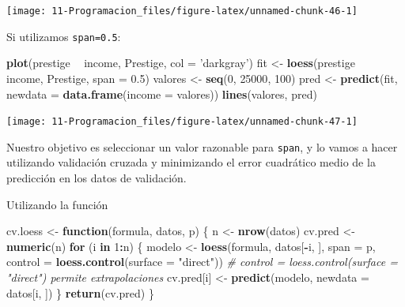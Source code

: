 \documentclass[]{book}
\newenvironment{Shaded}{\begin{snugshade}}{\end{snugshade}}
\newcommand{\KeywordTok}[1]{\textcolor[rgb]{0.13,0.29,0.53}{\textbf{#1}}}
\newcommand{\DataTypeTok}[1]{\textcolor[rgb]{0.13,0.29,0.53}{#1}}
\newcommand{\DecValTok}[1]{\textcolor[rgb]{0.00,0.00,0.81}{#1}}
\newcommand{\FloatTok}[1]{\textcolor[rgb]{0.00,0.00,0.81}{#1}}
\newcommand{\StringTok}[1]{\textcolor[rgb]{0.31,0.60,0.02}{#1}}
\newcommand{\CommentTok}[1]{\textcolor[rgb]{0.56,0.35,0.01}{\textit{#1}}}
\newcommand{\ControlFlowTok}[1]{\textcolor[rgb]{0.13,0.29,0.53}{\textbf{#1}}}
\newcommand{\OperatorTok}[1]{\textcolor[rgb]{0.81,0.36,0.00}{\textbf{#1}}}
\newcommand{\NormalTok}[1]{#1}
\begin{document}
\begin{center}\texttt{[image: 11-Programacion\_files/figure-latex/unnamed-chunk-46-1]} \end{center}

Si utilizamos \texttt{span=0.5}:

\begin{Shaded}
\begin{Highlighting}[]
\KeywordTok{plot}\NormalTok{(prestige }\OperatorTok{~}\StringTok{ }\NormalTok{income, Prestige, }\DataTypeTok{col =} \StringTok{'darkgray'}\NormalTok{)}
\NormalTok{fit <-}\StringTok{ }\KeywordTok{loess}\NormalTok{(prestige }\OperatorTok{~}\StringTok{ }\NormalTok{income, Prestige, }\DataTypeTok{span =} \FloatTok{0.5}\NormalTok{)}
\NormalTok{valores <-}\StringTok{ }\KeywordTok{seq}\NormalTok{(}\DecValTok{0}\NormalTok{, }\DecValTok{25000}\NormalTok{, }\DecValTok{100}\NormalTok{)}
\NormalTok{pred <-}\StringTok{ }\KeywordTok{predict}\NormalTok{(fit, }\DataTypeTok{newdata =} \KeywordTok{data.frame}\NormalTok{(}\DataTypeTok{income =}\NormalTok{ valores))}
\KeywordTok{lines}\NormalTok{(valores, pred)}
\end{Highlighting}
\end{Shaded}

\begin{center}\texttt{[image: 11-Programacion\_files/figure-latex/unnamed-chunk-47-1]} \end{center}

Nuestro objetivo es seleccionar un valor razonable para \texttt{span}, y
lo vamos a hacer utilizando validación cruzada y minimizando el error
cuadrático medio de la predicción en los datos de validación.

Utilizando la función

\begin{Shaded}
\begin{Highlighting}[]
\NormalTok{cv.loess <-}\StringTok{ }\ControlFlowTok{function}\NormalTok{(formula, datos, p) \{}
\NormalTok{  n <-}\StringTok{ }\KeywordTok{nrow}\NormalTok{(datos)}
\NormalTok{  cv.pred <-}\StringTok{ }\KeywordTok{numeric}\NormalTok{(n)}
  \ControlFlowTok{for}\NormalTok{ (i }\ControlFlowTok{in} \DecValTok{1}\OperatorTok{:}\NormalTok{n) \{}
\NormalTok{    modelo <-}\StringTok{ }\KeywordTok{loess}\NormalTok{(formula, datos[}\OperatorTok{-}\NormalTok{i, ], }\DataTypeTok{span =}\NormalTok{ p, }
                    \DataTypeTok{control =} \KeywordTok{loess.control}\NormalTok{(}\DataTypeTok{surface =} \StringTok{"direct"}\NormalTok{))}
    \CommentTok{# control = loess.control(surface = "direct") permite extrapolaciones}
\NormalTok{    cv.pred[i] <-}\StringTok{ }\KeywordTok{predict}\NormalTok{(modelo, }\DataTypeTok{newdata =}\NormalTok{ datos[i, ])}
\NormalTok{  \}}
  \KeywordTok{return}\NormalTok{(cv.pred)}
\NormalTok{\}}
\end{Highlighting}
\end{Shaded}
\end{document}
